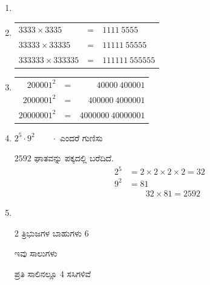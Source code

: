 \begin{enumerate}
\item
{\fontsize{5}{7}}

\item
\begin{tabular}[t]{lcl}
$3333\times 3335$ & = & $1111~5555$\\
$33333\times 33335$ & = & $11111~55555$\\
$333333\times 333335$ & = & $111111~555555$
\end{tabular}

\item
\begin{tabular}[t]{rcr}
$200001^{2}$ & = & $40000~400001$\\
$2000001^{2}$ & = & $400000~4000001$\\
$20000001^{2}$ & = & $4000000~40000001$
\end{tabular}

\item $2^{5} \cdot 9^{2}\qquad \cdot$ ಎಂದರೆ ಗುಣಿಸು

$2592$ ಘಾತವನ್ನು ಪಕ್ಕದಲ್ಲಿ ಬರೆದಿದೆ. 
\begin{align*}
2^{5} & = 2\times 2\times 2\times 2 = 32\\
9^{2} & = 81\\
& \qquad 32\times 81 = 2592
\end{align*}

\item
~

\begin{minipage}[c]{4cm}
2 ತ್ರಿಭುಜಗಳ ಬಾಹುಗಳು 6 

ಇವು ಸಾಲುಗಳು 

ಪ್ರತಿ ಸಾಲಿನಲ್ಲೂ 4 ಸಸಿಗಳಿವೆ 


\end{minipage}
\end{enumerate}
